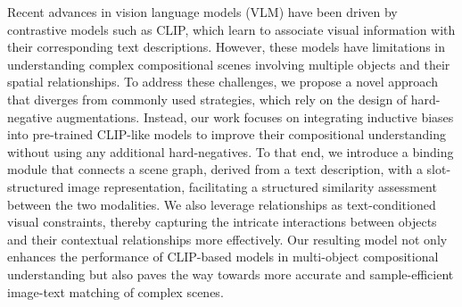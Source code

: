 Recent advances in vision language models (VLM) have been driven by contrastive models such as CLIP, which learn to associate visual information with their corresponding text descriptions. However, these models have limitations in understanding complex compositional scenes involving multiple objects and their spatial relationships. To address these challenges, we propose a novel approach that diverges from commonly used strategies, which rely on the design of hard-negative augmentations. Instead, our work focuses on integrating inductive biases into pre-trained CLIP-like models to improve their compositional understanding without using any additional hard-negatives. To that end, we introduce a binding module that connects a scene graph, derived from a text description, with a slot-structured image representation, facilitating a structured similarity assessment between the two modalities. We also leverage relationships as text-conditioned visual constraints, thereby capturing the intricate interactions between objects and their contextual relationships more effectively. Our resulting model not only enhances the performance of CLIP-based models in multi-object compositional understanding but also paves the way towards more accurate and sample-efficient image-text matching of complex scenes.
